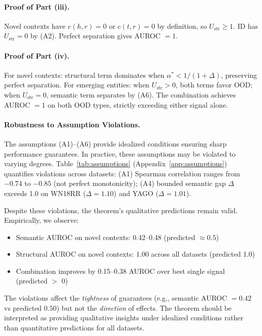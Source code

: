 \documentclass[accepted]{uai2024}  %
\begin{document}
\paragraph{Proof of Part (iii).}
Novel contexts have $c(h,r) = 0$ or $c(t,r) = 0$ by definition, so $U_{\text{str}} \geq 1$. ID has $U_{\text{str}} = 0$ by (A2). Perfect separation gives AUROC $= 1$.

\paragraph{Proof of Part (iv).}
For novel contexts: structural term dominates when $\alpha^* < 1/(1+\Delta)$, preserving perfect separation. For emerging entities: when $U_{\text{str}} > 0$, both terms favor OOD; when $U_{\text{str}} = 0$, semantic term separates by (A6). The combination achieves AUROC $= 1$ on both OOD types, strictly exceeding either signal alone.

\paragraph{Robustness to Assumption Violations.}
The assumptions (A1)--(A6) provide idealized conditions ensuring sharp performance guarantees. In practice, these assumptions may be violated to varying degrees. Table~\ref{tab:assumptions} (Appendix~\ref{app:assumptions}) quantifies violations across datasets: (A1) Spearman correlation ranges from $-0.74$ to $-0.85$ (not perfect monotonicity); (A4) bounded semantic gap $\Delta$ exceeds 1.0 on WN18RR ($\Delta=1.10$) and YAGO ($\Delta=1.01$).

Despite these violations, the theorem's qualitative predictions remain valid. Empirically, we observe:
\begin{itemize}
\item Semantic AUROC on novel contexts: 0.42--0.48 (predicted $\approx 0.5$)
\item Structural AUROC on novel contexts: 1.00 across all datasets (predicted 1.0)
\item Combination improves by 0.15--0.38 AUROC over best single signal (predicted $>$ 0)
\end{itemize}

The violations affect the \emph{tightness} of guarantees (e.g., semantic AUROC $= 0.42$ vs predicted $0.50$) but not the \emph{direction} of effects. The theorem should be interpreted as providing qualitative insights under idealized conditions rather than quantitative predictions for all datasets.
\end{document}
